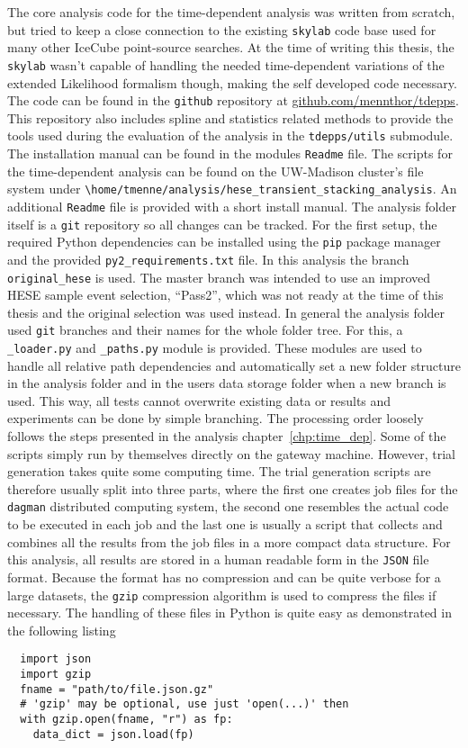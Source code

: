 The core analysis code for the time-dependent analysis was written from scratch, but tried to keep a close connection to the existing \lstinline!skylab! code base used for many other IceCube point-source searches.
At the time of writing this thesis, the \lstinline!skylab! wasn't capable of handling the needed time-dependent variations of the extended Likelihood formalism though, making the self developed code necessary.
The code can be found in the \lstinline!github! repository at \url{github.com/mennthor/tdepps}.
This repository also includes spline and statistics related methods to provide the tools used during the evaluation of the analysis in the \lstinline!tdepps/utils! submodule.
The installation manual can be found in the modules \lstinline!Readme! file.
The scripts for the time-dependent analysis can be found on the UW-Madison cluster's file system under \lstinline!\home/tmenne/analysis/hese_transient_stacking_analysis!.
An additional \lstinline!Readme! file is provided with a short install manual.
The analysis folder itself is a \lstinline!git! repository so all changes can be tracked.
For the first setup, the required Python dependencies can be installed using the \lstinline!pip! package manager and the provided \lstinline!py2_requirements.txt! file.
In this analysis the branch \lstinline!original_hese! is used.
The master branch was intended to use an improved HESE sample event selection, \enquote{Pass2}, which was not ready at the time of this thesis and the original selection was used instead.
In general the analysis folder used \lstinline!git! branches and their names for the whole folder tree.
For this, a \lstinline!_loader.py! and \lstinline!_paths.py! module is provided.
These modules are used to handle all relative path dependencies and automatically set a new folder structure in the analysis folder and in the users data storage folder when a new branch is used.
This way, all tests cannot overwrite existing data or results and experiments can be done by simple branching.
The processing order loosely follows the steps presented in the analysis chapter~\ref{chp:time_dep}.
Some of the scripts simply run by themselves directly on the gateway machine.
However, trial generation takes quite some computing time.
The trial generation scripts are therefore usually split into three parts, where the first one creates job files for the \lstinline!dagman! distributed computing system, the second one resembles the actual code to be executed in each job and the last one is usually a script that collects and combines all the results from the job files in a more compact data structure.
For this analysis, all results are stored in a human readable form in the \lstinline!JSON! file format.
Because the format has no compression and can be quite verbose for a large datasets, the \lstinline!gzip! compression algorithm is used to compress the files if necessary.
The handling of these files in Python is quite easy as demonstrated in the following listing
\begin{lstlisting}
  import json
  import gzip
  fname = "path/to/file.json.gz"
  # 'gzip' may be optional, use just 'open(...)' then
  with gzip.open(fname, "r") as fp:
    data_dict = json.load(fp)
\end{lstlisting}

